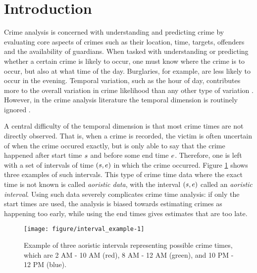 \section{Introduction}

Crime analysis is concerned with understanding and predicting crime by evaluating core aspects of crimes such as their location, time, targets, offenders and the availability of guardians. When tasked with understanding or predicting whether a certain crime is likely to occur, one must know where the crime is to occur, but also at what time of the day. Burglaries, for example, are less likely to occur in the evening. Temporal variation, such as the hour of day, contributes more to the overall variation in crime likelihood than any other type of variation \citep{felson2003simple}. However, in the crime analysis literature the temporal dimension is routinely ignored \citep{ratcliffe1998aoristic, ratcliffe2000aoristic}.

A central difficulty of the temporal dimension is that most crime times are not directly observed. That is, when a crime is recorded, the victim is often uncertain of when the crime occured exactly, but is only able to say that the crime happened after start time $s$ and before some end time $e$. Therefore, one is left with a set of intervals of time $(s, e)$ in which the crime occurred. Figure \ref{exdat} shows three examples of such intervals. This type of crime time data where the exact time is not known is called \textit{aoristic data}, with the interval $(s, e)$ called an  \textit{aoristic interval}. Using such data severely complicates crime time analysis: if only the start times are used, the analysis is biased towards estimating crimes as happening too early, while using the end times gives estimates that are too late.

\begin{figure}
\centering
\begin{knitrout}
\color{fgcolor}
\texttt{[image: figure/interval\_example-1]} 

\end{knitrout}
\caption{Example of three aoristic intervals representing possible crime times, which are 2 AM - 10 AM (red), 8 AM - 12 AM (green), and 10 PM - 12 PM (blue). } \label{exdat}
\end{figure}

